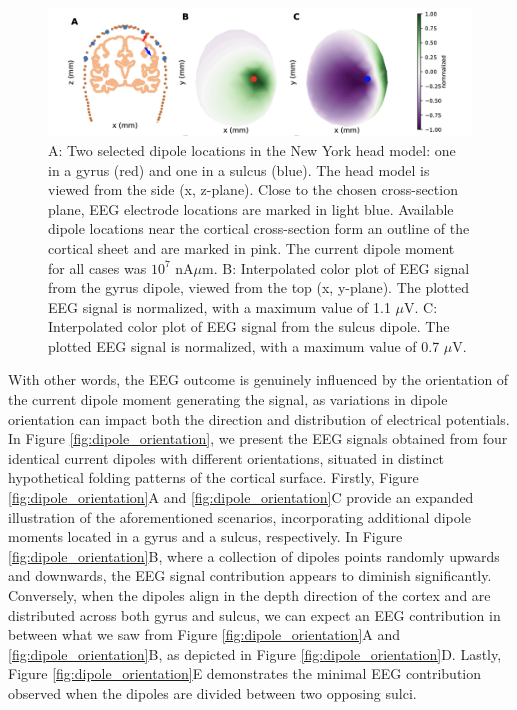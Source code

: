 \documentclass[a4paper, UKenglish, 11pt]{uiomaster}
\begin{document}
\begin{figure}[!htb]
    \centering
    \includegraphics[width=\linewidth]{figures/gyrus_and_sulcus_EEG.png}
    \caption{A: Two selected dipole locations in the New York head model: one in a gyrus (red) and one in a sulcus (blue). The head model is viewed from the side (x, z-plane). Close to the chosen cross-section plane, EEG electrode locations are marked in light blue. Available dipole locations near the cortical cross-section form an outline of the cortical sheet and are marked in pink. The current dipole moment for all cases was $10^7$ nA$\mu$m. B: Interpolated color plot of EEG signal from the gyrus dipole, viewed from the top (x, y-plane). The plotted EEG signal is normalized, with a maximum value of 1.1 $\mu$V. C: Interpolated color plot of EEG signal from the sulcus dipole. The plotted EEG signal is normalized, with a maximum value of 0.7 $\mu$V. \cite{naess2021biophysically}}
    \label{fig:gyrus_and_sulcus_EEG}
\end{figure}

With other words, the EEG outcome is genuinely influenced by the orientation of the current dipole moment generating the signal, as variations in dipole orientation can impact both the direction and distribution of electrical potentials. In Figure \ref{fig:dipole_orientation}, we present the EEG signals obtained from four identical current dipoles with different orientations, situated in distinct hypothetical folding patterns of the cortical surface. Firstly, Figure \ref{fig:dipole_orientation}A and \ref{fig:dipole_orientation}C provide an expanded illustration of the aforementioned scenarios, incorporating additional dipole moments located in a gyrus and a sulcus, respectively. In Figure \ref{fig:dipole_orientation}B, where a collection of dipoles points randomly upwards and downwards, the EEG signal contribution appears to diminish significantly. Conversely, when the dipoles align in the depth direction of the cortex and are distributed across both gyrus and sulcus, we can expect an EEG contribution in between what we saw from Figure \ref{fig:dipole_orientation}A and \ref{fig:dipole_orientation}B, as depicted in Figure \ref{fig:dipole_orientation}D. Lastly, Figure \ref{fig:dipole_orientation}E demonstrates the minimal EEG contribution observed when the dipoles are divided between two opposing sulci.
\end{document}
